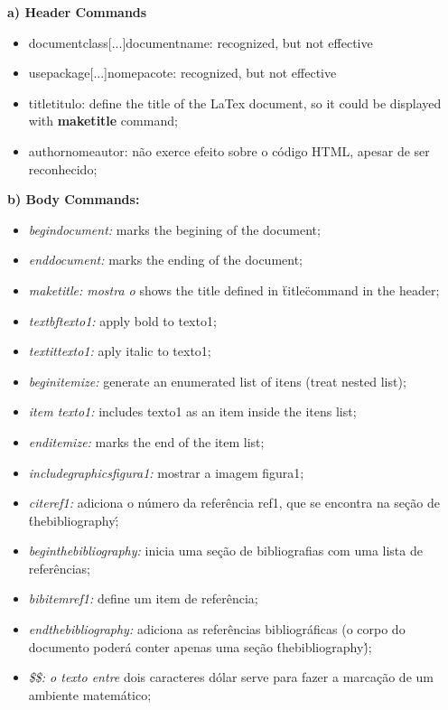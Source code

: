 \documentclass{article}
\begin{document}
\begin{itemzie}

	\item \textbf{a) Header Commands}
		\begin{itemize}
			 \item documentclass[...]{documentname}: recognized, but not effective
			 \item usepackage[...]{nomepacote}:  recognized, but not effective
			 \item title{titulo}: define the title of the LaTex document, so it could be displayed with \textbf{maketitle} command;
			 \item author{nomeautor}: não exerce efeito sobre o código HTML, apesar de ser reconhecido;
		\end{itemize}

	\item \textbf{b) Body Commands:}
		\begin{itemize}
	 		\item \textit{begin{document}:} marks the begining of the document;
	 		\item \textit{end{document}:} marks the ending of the document;
	 		\item \textit{maketitle: mostra o} shows the title defined in \"title\" command in the header;
	 		\item \textit{textbf{texto1}:} apply bold to texto1;
	 		\item \textit{textit{texto1}:} aply italic to texto1;
	 		\item \textit{begin{itemize}:} generate an enumerated list of itens (treat nested list);
	 		\item \textit{item texto1:} includes texto1 as an item inside the itens list; 
	 		\item \textit{end{itemize}:} marks the end of the item list;
	 		\item \textit{includegraphics{figura1}:} mostrar a imagem figura1;
	 		\item \textit{cite{ref1}:} adiciona o número da referência ref1, que se encontra na seção de \'thebibliography\';
	 		\item \textit{begin{thebibliography}:} inicia uma seção de bibliografias com uma lista de referências;
	 		\item \textit{bibitem{ref1}:} define um item de referência;
	 		\item \textit{end{thebibliography}:} adiciona as referências bibliográficas (o corpo do documento poderá conter apenas uma seção \'thebibliography\');
	 		\item \textit{\$\$: o texto entre} dois caracteres dólar serve para fazer a marcação de um ambiente matemático;
		\end{itemize}


\end{itemzie}
\end{document}
